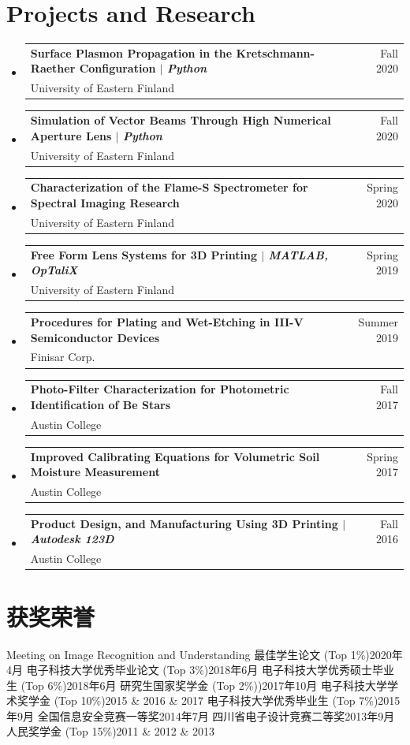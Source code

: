 \documentclass[A4, 11pt, UTF8]{ctexart}
\makeatletter
\newcommand{\CVSubheading}[4]{
	\vspace{-2pt}\item
	\begin{tabular*}{0.97\textwidth}[t]{l@{\extracolsep{\fill}}r}
		\textbf{#1} & #2 \\
		\small#3 & \small #4 \\
	\end{tabular*}\vspace{-7pt}
}
\newcommand{\CVSubHeadingListStart}{\begin{itemize}[leftmargin=0.5cm, label={}]}
\newcommand{\CVSubHeadingListEnd}{\end{itemize}}
\makeatother
\begin{document}

		
		\section{Projects and Research}
		\CVSubHeadingListStart
		\CVSubheading
		{{Surface Plasmon Propagation in the Kretschmann-Raether Configuration} $|$ \emph{\small{Python}}}{Fall 2020}
		{University of Eastern Finland}{}
		\CVSubheading
		{{Simulation of Vector Beams Through High Numerical Aperture Lens} $|$ \emph{\small{Python}}}{Fall 2020}
		{University of Eastern Finland}{}
		\CVSubheading
		{Characterization of the Flame-S Spectrometer for Spectral Imaging Research}{Spring 2020}
		{University of Eastern Finland}{}
		\CVSubheading
		{{Free Form Lens Systems for 3D Printing} $|$ \emph{\small{MATLAB, OpTaliX}}}{Spring 2019}
		{University of Eastern Finland}{}
		\CVSubheading
		{Procedures for Plating and Wet-Etching in III-V Semiconductor Devices}{Summer 2019}
		{Finisar Corp.}{}
		\CVSubheading
		{Photo-Filter Characterization for Photometric Identification of Be Stars}{Fall 2017}
		{Austin College}{}
		\CVSubheading
		{Improved Calibrating Equations for Volumetric Soil Moisture Measurement}{Spring 2017}
		{Austin College}{}
		\CVSubheading
		{{Product Design, and Manufacturing Using 3D Printing} $|$ \emph{\small{Autodesk 123D}}}{Fall 2016}
		{Austin College}{}
		\CVSubHeadingListEnd
		
			
		\section{获奖荣誉}
		\resumeSubHeadingListStart
		\resumeProjectHeading
		{Meeting on Image Recognition and Understanding 最佳学生论文 (Top 1\%)}{2020年4月}
		\resumeProjectHeading
		{电子科技大学优秀毕业论文 (Top 3\%)}{2018年6月}
		\resumeProjectHeading
		{电子科技大学优秀硕士毕业生 (Top 6\%)}{2018年6月}
		\resumeProjectHeading
		{研究生国家奖学金 (Top 2\%))}{2017年10月}
		\resumeProjectHeading
		{电子科技大学学术奖学金 (Top 10\%)}{2015 \& 2016 \& 2017}
		\resumeProjectHeading
		{电子科技大学优秀毕业生 (Top 7\%)}{2015年9月}
		\resumeProjectHeading
		{全国信息安全竞赛一等奖}{2014年7月}
		\resumeProjectHeading
		{四川省电子设计竞赛二等奖}{2013年9月}
		\resumeProjectHeading
		{人民奖学金 (Top 15\%)}{2011 \& 2012 \& 2013}
		\resumeSubHeadingListEnd
		
\end{document}
